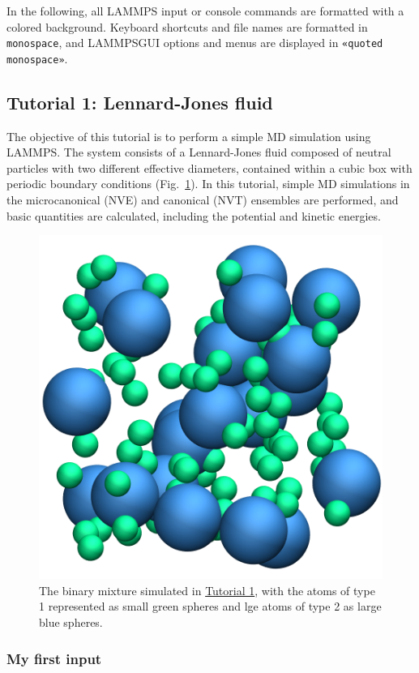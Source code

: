 \documentclass[9pt,tutorial]{livecoms}
\newcommand{\lmpcmd}[1]{\hspace{0pt}\colorbox{listing}{\textcolor{command}{\small{#1}}}\hspace{0pt}} %
\newcommand{\flecmd}[1]{\textcolor{command}{\texttt{#1}}} %
\newcommand{\guicmd}[1]{\textcolor{command}{\texttt{«#1»}}} %
\newcommand{\lammpsgui}{\textsf{LAMMPS\textendash GUI}}
\begin{document}
In the following, all LAMMPS input or console commands are formatted
with a \lmpcmd{colored background}.  Keyboard shortcuts and
file names are formatted in \flecmd{monospace}, and \lammpsgui{} options and menus
are displayed in \guicmd{quoted monospace}.

\subsection{Tutorial 1: Lennard-Jones fluid}
\label{lennard-jones-label}

The objective of this tutorial is to perform a simple MD simulation
using LAMMPS.  The system consists of a Lennard-Jones fluid composed of neutral
particles with two different effective diameters, contained within a
cubic box with periodic boundary conditions (Fig.~\ref{fig:LJ-avatar}).  In
this tutorial, simple MD simulations in the microcanonical
(NVE) and canonical (NVT) ensembles are performed, and basic quantities are calculated,
including the potential and kinetic energies.

\begin{figure}
\centering
\includegraphics[width=0.55\linewidth]{LJ-avatar}
\caption{The binary mixture simulated in \hyperref[lennard-jones-label]{Tutorial 1},
with the atoms of type 1 represented as small green spheres and lge atoms of type 2
as large blue spheres.}
\label{fig:LJ-avatar}
\end{figure}

\subsubsection{My first input}
\end{document}
